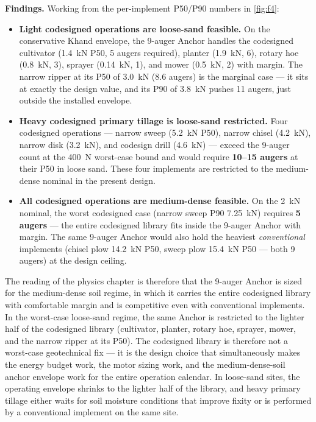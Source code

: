 \documentclass[11pt,a4paper]{article}
\begin{document}
\textbf{Findings.} Working from the per-implement P50/P90 numbers in \cref{fig:f4}:
\begin{itemize}[leftmargin=1.6em,itemsep=0.15em]
    \item \textbf{Light codesigned operations are loose-sand feasible.} On the conservative Khand envelope, the 9-auger Anchor handles the codesigned cultivator (\SI{1.4}{\kilo\newton} P50, 5 augers required), planter (\SI{1.9}{\kilo\newton}, 6), rotary hoe (\SI{0.8}{\kilo\newton}, 3), sprayer (\SI{0.14}{\kilo\newton}, 1), and mower (\SI{0.5}{\kilo\newton}, 2) with margin. The narrow ripper at its P50 of \SI{3.0}{\kilo\newton} (8.6 augers) is the marginal case --- it sits at exactly the design value, and its P90 of \SI{3.8}{\kilo\newton} pushes 11 augers, just outside the installed envelope.
    \item \textbf{Heavy codesigned primary tillage is loose-sand restricted.} Four codesigned operations --- narrow sweep (\SI{5.2}{\kilo\newton} P50), narrow chisel (\SI{4.2}{\kilo\newton}), narrow disk (\SI{3.2}{\kilo\newton}), and codesign drill (\SI{4.6}{\kilo\newton}) --- exceed the 9-auger count at the \SI{400}{\newton} worst-case bound and would require \textbf{10--15 augers} at their P50 in loose sand. These four implements are restricted to the medium-dense nominal in the present design.
    \item \textbf{All codesigned operations are medium-dense feasible.} On the \SI{2}{\kilo\newton} nominal, the worst codesigned case (narrow sweep P90 \SI{7.25}{\kilo\newton}) requires \textbf{5 augers} --- the entire codesigned library fits inside the 9-auger Anchor with margin. The same 9-auger Anchor would also hold the heaviest \emph{conventional} implements (chisel plow \SI{14.2}{\kilo\newton} P50, sweep plow \SI{15.4}{\kilo\newton} P50 --- both 9 augers) at the design ceiling.
\end{itemize}

The reading of the physics chapter is therefore that the 9-auger Anchor is sized for the medium-dense soil regime, in which it carries the entire codesigned library with comfortable margin and is competitive even with conventional implements. In the worst-case loose-sand regime, the same Anchor is restricted to the lighter half of the codesigned library (cultivator, planter, rotary hoe, sprayer, mower, and the narrow ripper at its P50). The codesigned library is therefore not a worst-case geotechnical fix --- it is the design choice that simultaneously makes the energy budget work, the motor sizing work, and the medium-dense-soil anchor envelope work for the entire operation calendar. In loose-sand sites, the operating envelope shrinks to the lighter half of the library, and heavy primary tillage either waits for soil moisture conditions that improve fixity or is performed by a conventional implement on the same site.
\end{document}
